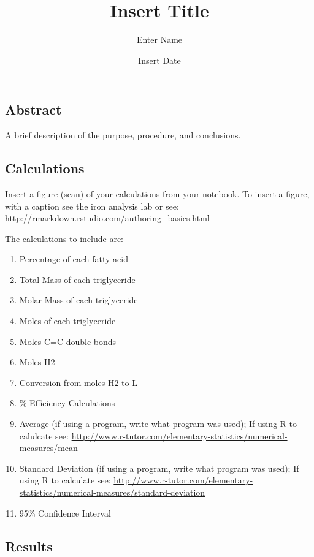 \documentclass[]{article}
\title{Insert Title}
\author{Enter Name}
\date{Insert Date}
\providecommand{\tightlist}{%
  \setlength{\itemsep}{0pt}\setlength{\parskip}{0pt}}
\begin{document}
\maketitle

\subsection{Abstract}\label{abstract}

A brief description of the purpose, procedure, and conclusions.

\subsection{Calculations}\label{calculations}

Insert a figure (scan) of your calculations from your notebook. To
insert a figure, with a caption see the iron analysis lab or see:
\url{http://rmarkdown.rstudio.com/authoring_basics.html}

The calculations to include are:

\begin{enumerate}
\def\labelenumi{\arabic{enumi}.}
\tightlist
\item
  Percentage of each fatty acid
\item
  Total Mass of each triglyceride
\item
  Molar Mass of each triglyceride
\item
  Moles of each triglyceride
\item
  Moles C=C double bonds
\item
  Moles H2
\item
  Conversion from moles H2 to L
\item
  \% Efficiency Calculations
\item
  Average (if using a program, write what program was used); If using R
  to calulcate see:
  \url{http://www.r-tutor.com/elementary-statistics/numerical-measures/mean}
\item
  Standard Deviation (if using a program, write what program was used);
  If using R to calculate see:
  \url{http://www.r-tutor.com/elementary-statistics/numerical-measures/standard-deviation}
\item
  95\% Confidence Interval
\end{enumerate}

\subsection{Results}\label{results}
\end{document}
